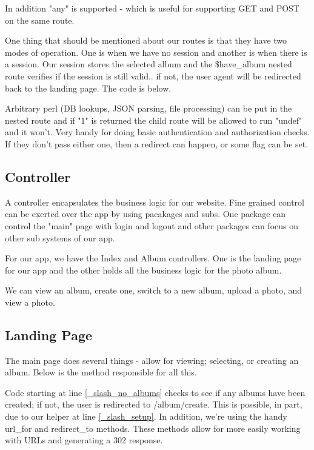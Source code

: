 \documentclass[14pt]{extreport}
\newcommand\Small{\fontsize{10}{10.2}\selectfont}
\newcommand*\LSTfont{\Small\ttfamily\SetTracking{encoding=*}{-60}\lsstyle}
\begin{document}
In addition "any" is supported - which is useful for supporting GET and POST on
the same route.

One thing that should be mentioned about our routes is that they have two modes of
operation.  One is when we have no session and another is when there is a session.
Our session stores the selected album and the \$have\_album nested route verifies
if the session is still valid.. if not, the user agent will be redirected back to the
landing page.  The code is below.



Arbitrary perl (DB lookups, JSON parsing, file processing) can be put in the
nested route and if "1" is returned the child route will be allowed to run
"undef" and it won't.  Very handy for doing basic authentication and
authorization checks.  If they don't pass either one, then a redirect can
happen, or some flag can be set.

\subsection{Controller}

A controller encapsulates the business logic for our website.  Fine grained
control can be exerted over the app by using pacakages and subs.  One package
can control the "main" page with login and logout and other packages can focus
on other sub systems of our app.

For our app, we have the Index and Album controllers.  One is the landing page for
our app and the other holds all the business logic for the photo album.

We can view an album, create one, switch to a new album, upload a photo, and
view a photo.

\subsection{Landing Page}

The main page does several things - allow for viewing; selecting, or creating
an album.  Below is the method responsible for all this.



Code starting at line \ref{_slash_no_albums} checks to see if any albums have
been created; if not, the user is redirected to /album/create.  This is
possible, in part, due to our helper at line \ref{_slash_setup}.  In addition,
we're using the handy url\_for and redirect\_to methods. These methods allow
for more easily working with URLs and generating a 302 response.
\end{document}
